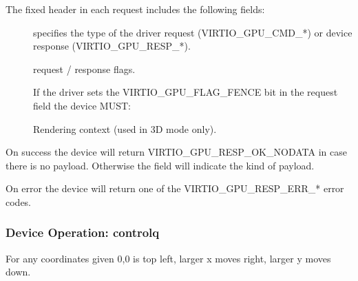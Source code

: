 The fixed header  in each
request includes the following fields:

\begin{description}
\item[] specifies the type of the driver request
  (VIRTIO_GPU_CMD_*) or device response (VIRTIO_GPU_RESP_*).
\item[] request / response flags.
\item[] If the driver sets the VIRTIO_GPU_FLAG_FENCE
  bit in the request  field the device MUST:
\item[] Rendering context (used in 3D mode only).
\end{description}

On success the device will return VIRTIO_GPU_RESP_OK_NODATA in
case there is no payload.  Otherwise the  field will
indicate the kind of payload.

On error the device will return one of the
VIRTIO_GPU_RESP_ERR_* error codes.

\subsubsection{Device Operation: controlq}\label{sec:Device Types / GPU Device / Device Operation / Device Operation: controlq}

For any coordinates given 0,0 is top left, larger x moves right,
larger y moves down.

